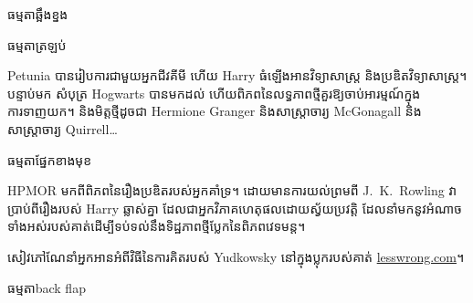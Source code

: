 \documentclass[12pt,coverwidth=\the\hpcoverwidth,coverheight=\the\hpcoverheight,spinewidth=\the\hpspinewidth,marklength=0mm,bleedwidth=5mm,flapwidth=63mm]{bookcover}
\begin{document}
\begin{bookcover}

\begin{bookcoverelement}{ធម្មតា}{ឆ្អឹងខ្នង}
\centering
\color{white}\scshape
\vspace{0.5cm}\huge \volumenumber\\[2ex]\Large
\vfill
{}
\vfill
\end{bookcoverelement}

\begin{bookcoverelement}{ធម្មតា}{ត្រឡប់}
\centering
  \vspace{20mm}
\parbox{110mm}{\color{white}\Large\raggedright
Petunia បានរៀបការជាមួយអ្នកជីវគីមី ហើយ Harry ធំឡើងអានវិទ្យាសាស្ត្រ និងប្រឌិតវិទ្យាសាស្រ្ត។ បន្ទាប់មក សំបុត្រ Hogwarts បានមកដល់ ហើយពិភពនៃលទ្ធភាពថ្មីគួរឱ្យចាប់អារម្មណ៍ក្នុងការទាញយក។ និងមិត្តថ្មីដូចជា Hermione Granger និងសាស្រ្តាចារ្យ McGonagall និងសាស្រ្តាចារ្យ Quirrell…
}
\end{bookcoverelement}

\begin{bookcoverelement}{ធម្មតា}{ផ្នែកខាងមុខ}
\centering
\vspace{20mm}
\parbox{40mm}{\color{white}\raggedright\small
HPMOR មកពីពិភពនៃរឿងប្រឌិតរបស់អ្នកគាំទ្រ។ ដោយមានការយល់ព្រមពី J.~K.~Rowling វាប្រាប់ពីរឿងរបស់ Harry ឆ្លាស់គ្នា ដែលជាអ្នកវិភាគហេតុផលដោយស្វ័យប្រវត្តិ ដែលនាំមកនូវអំណាចទាំងអស់របស់គាត់ដើម្បីទប់ទល់នឹងទិដ្ឋភាពថ្មីប្លែកនៃពិភពវេទមន្ត។

\bigskip សៀវភៅណែនាំអ្នកអានអំពីវិធីនៃការគិតរបស់ Yudkowsky នៅក្នុងប្លុករបស់គាត់ \url{lesswrong.com}។}
\end{bookcoverelement}

\begin{bookcoverelement}{ធម្មតា}{back flap}
\centering
\vspace{20mm}
\parbox{40mm}{\color{white}\small\raggedright
}
\end{bookcoverelement}

\end{bookcover}
\end{document}
